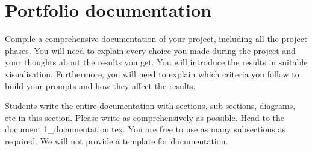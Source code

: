 \setcounter{page}{1}
\section{Portfolio documentation}
\label{sec:documentation}

Compile a comprehensive documentation of your project, including all the project phases. You will need to explain every choice you made during the project and your thoughts about the results you get. You will introduce the results in suitable visualisation. Furthermore, you will need to explain which criteria you follow to build your prompts and how they affect the results. 

Students write the entire documentation with sections, sub-sections, diagrams, etc in this section. Please write as comprehensively as possible. Head to the document 1\_documentation.tex. You are free to use as many subsections as required. We will not provide a template for documentation. 